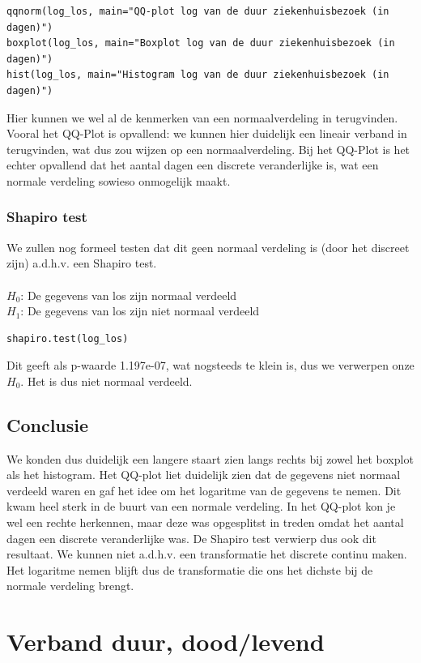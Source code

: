 \documentclass{article}
\begin{document}
\begin{verbatim}
qqnorm(log_los, main="QQ-plot log van de duur ziekenhuisbezoek (in dagen)")
boxplot(log_los, main="Boxplot log van de duur ziekenhuisbezoek (in dagen)")
hist(log_los, main="Histogram log van de duur ziekenhuisbezoek (in dagen)")
\end{verbatim}
Hier kunnen we wel al de kenmerken van een normaalverdeling in terugvinden. Vooral het QQ-Plot is opvallend: we kunnen hier duidelijk een lineair verband in terugvinden, wat dus zou wijzen op een normaalverdeling. Bij het QQ-Plot is het echter opvallend dat het aantal dagen een discrete veranderlijke is, wat een normale verdeling sowieso onmogelijk maakt. 

\subsubsection{Shapiro test}

We zullen nog formeel testen dat dit geen normaal verdeling is (door het discreet zijn) a.d.h.v. een Shapiro test.  \\ \\
$H_0$: De gegevens van los zijn normaal verdeeld \\
$H_1$: De gegevens van los zijn niet normaal verdeeld 
\begin{verbatim}
shapiro.test(log_los)
\end{verbatim}

Dit geeft als p-waarde 1.197e-07, wat nogsteeds te klein is, dus we verwerpen onze $H_0$. Het is dus niet normaal verdeeld. 

\subsection{Conclusie}
We konden dus duidelijk een langere staart zien langs rechts bij zowel het boxplot als het histogram. Het QQ-plot liet duidelijk zien dat de gegevens niet normaal verdeeld waren en gaf het idee om het logaritme van de gegevens te nemen. Dit kwam heel sterk in de buurt van een normale verdeling. In het QQ-plot kon je wel een rechte herkennen, maar deze was opgesplitst in treden omdat het aantal dagen een discrete veranderlijke was. De Shapiro test verwierp dus ook dit resultaat. We kunnen niet a.d.h.v. een transformatie het discrete continu maken. Het logaritme nemen blijft dus de transformatie die ons het dichste bij de normale verdeling brengt.

\section{Verband duur, dood/levend}
\end{document}
